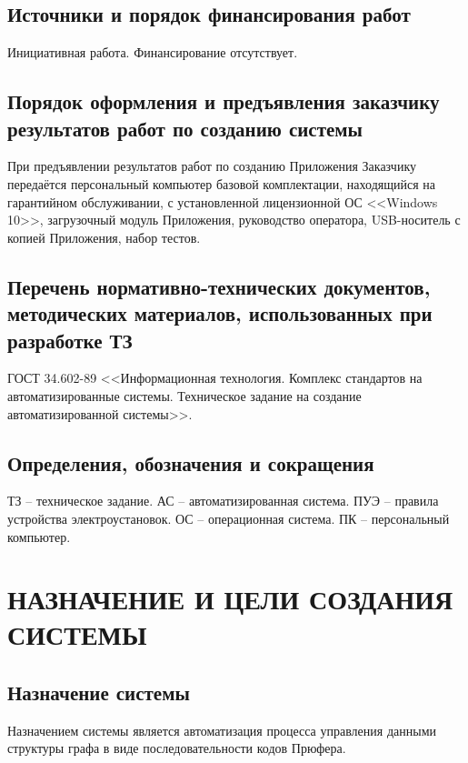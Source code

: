 \documentclass[12pt,a4paper]{article}
\begin{document}
\subsection{Источники и порядок финансирования работ}
Инициативная работа. Финансирование отсутствует.

\subsection{Порядок оформления и предъявления заказчику результатов работ по созданию системы}
При предъявлении результатов работ по созданию Приложения Заказчику передаётся персональный компьютер базовой 
комплектации, находящийся на гарантийном обслуживании, с установленной лицензионной ОС <<Windows 10>>, 
загрузочный модуль Приложения, руководство оператора, USB-носитель с копией Приложения, набор тестов.

\subsection{Перечень нормативно-технических документов, методических материалов, использованных при разработке ТЗ}
ГОСТ 34.602-89 <<Информационная технология. Комплекс стандартов на автоматизированные системы. Техническое задание
на создание автоматизированной системы>>.

\subsection{Определения, обозначения и сокращения}
ТЗ -- техническое задание. \medskip \newline
АС -- автоматизированная система. \medskip \newline
ПУЭ -- правила устройства электроустановок.\medskip \newline
ОС -- операционная система.\medskip \newline
ПК -- персональный компьютер.

\newpage
\section{НАЗНАЧЕНИЕ И ЦЕЛИ СОЗДАНИЯ СИСТЕМЫ}
\subsection{Назначение системы}
Назначением системы является автоматизация процесса управления данными структуры графа в виде последовательности 
кодов Прюфера.
\end{document}
